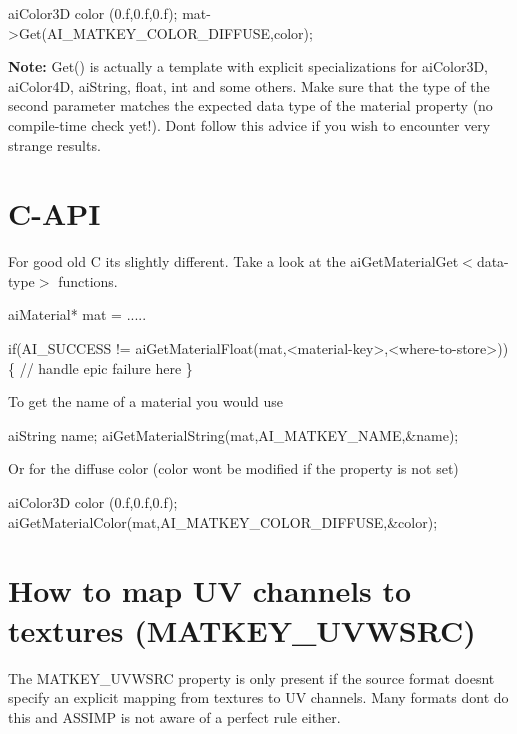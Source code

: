 \begin{DoxyCode}
aiColor3D color (0.f,0.f,0.f);
mat->Get(AI\_MATKEY\_COLOR\_DIFFUSE,color);
\end{DoxyCode}


{\bfseries Note\+:} Get() is actually a template with explicit specializations for ai\+Color3\+D, ai\+Color4\+D, ai\+String, float, int and some others. Make sure that the type of the second parameter matches the expected data type of the material property (no compile-\/time check yet!). Don\textquotesingle{}t follow this advice if you wish to encounter very strange results.\hypertarget{materials_C}{}\section{C-\/\+A\+P\+I}\label{materials_C}
For good old C it\textquotesingle{}s slightly different. Take a look at the ai\+Get\+Material\+Get$<$data-\/type$>$ functions.


\begin{DoxyCode}
aiMaterial* mat = .....

if(AI\_SUCCESS != aiGetMaterialFloat(mat,<material-key>,<where-to-store>)) \{
   \textcolor{comment}{// handle epic failure here}
\}
\end{DoxyCode}


To get the name of a material you would use


\begin{DoxyCode}
aiString name;
aiGetMaterialString(mat,AI\_MATKEY\_NAME,&name);
\end{DoxyCode}


Or for the diffuse color (\textquotesingle{}color\textquotesingle{} won\textquotesingle{}t be modified if the property is not set)


\begin{DoxyCode}
aiColor3D color (0.f,0.f,0.f);
aiGetMaterialColor(mat,AI\_MATKEY\_COLOR\_DIFFUSE,&color);
\end{DoxyCode}
\hypertarget{materials_uvwsrc}{}\section{How to map U\+V channels to textures (\+M\+A\+T\+K\+E\+Y\+\_\+\+U\+V\+W\+S\+R\+C)}\label{materials_uvwsrc}
The M\+A\+T\+K\+E\+Y\+\_\+\+U\+V\+W\+S\+R\+C property is only present if the source format doesn\textquotesingle{}t specify an explicit mapping from textures to U\+V channels. Many formats don\textquotesingle{}t do this and A\+S\+S\+I\+M\+P is not aware of a perfect rule either.

